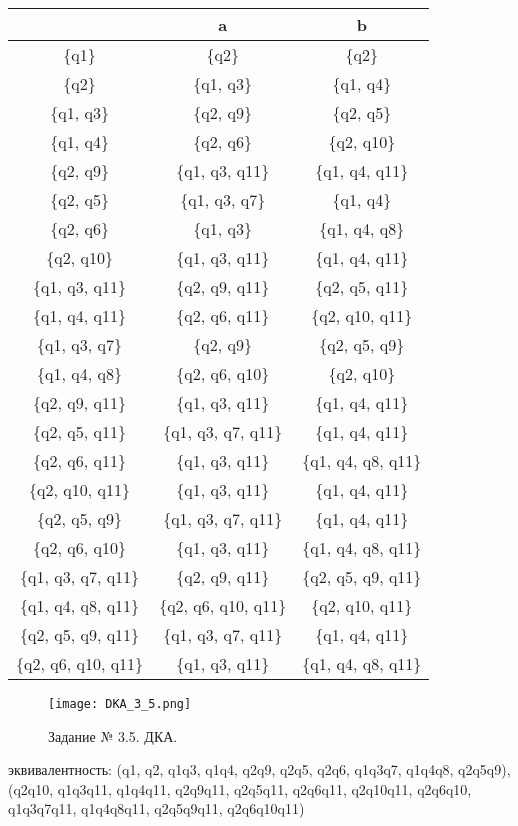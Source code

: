 \documentclass[a4paper, 12pt]{article}
\begin{document}
\begin{enumerate}
\begin{center}
\begin{tabular}{ |c|c|c| } 
\hline
\, & a & b \\
\hline
 \{q1\} & \{q2\} & \{q2\} \\
\hline
 \{q2\} & \{q1, q3\} & \{q1, q4\} \\
\hline
 \{q1, q3\} & \{q2, q9\} & \{q2, q5\} \\
\hline
 \{q1, q4\} & \{q2, q6\} & \{q2, q10\} \\
\hline
 \{q2, q9\} & \{q1, q3, q11\} & \{q1, q4, q11\} \\
\hline
 \{q2, q5\} & \{q1, q3, q7\} & \{q1, q4\} \\
\hline
 \{q2, q6\} & \{q1, q3\} & \{q1, q4, q8\} \\
\hline
\{q2, q10\} & \{q1, q3, q11\} & \{q1, q4, q11\} \\
\hline
\{q1, q3, q11\} & \{q2, q9, q11\} & \{q2, q5, q11\} \\
\hline
\{q1, q4, q11\} & \{q2, q6, q11\} & \{q2, q10, q11\} \\
\hline
\{q1, q3, q7\} & \{q2, q9\} & \{q2, q5, q9\} \\
\hline
\{q1, q4, q8\} & \{q2, q6, q10\} & \{q2, q10\} \\
\hline
\{q2, q9, q11\} & \{q1, q3, q11\} & \{q1, q4, q11\} \\
\hline
\{q2, q5, q11\} & \{q1, q3, q7, q11\} & \{q1, q4, q11\} \\
\hline
\{q2, q6, q11\} & \{q1, q3, q11\} & \{q1, q4, q8, q11\} \\
\hline
\{q2, q10, q11\} & \{q1, q3, q11\} & \{q1, q4, q11\} \\
\hline
\{q2, q5, q9\} & \{q1, q3, q7, q11\} & \{q1, q4, q11\} \\
\hline
\{q2, q6, q10\} & \{q1, q3, q11\} & \{q1, q4, q8, q11\} \\
\hline
\{q1, q3, q7, q11\} & \{q2, q9, q11\} & \{q2, q5, q9, q11\} \\
\hline
\{q1, q4, q8, q11\} & \{q2, q6, q10, q11\} & \{q2, q10, q11\} \\
\hline
\{q2, q5, q9, q11\} & \{q1, q3, q7, q11\} & \{q1, q4, q11\} \\
\hline
\{q2, q6, q10, q11\} & \{q1, q3, q11\} & \{q1, q4, q8, q11\} \\
\hline
\end{tabular}
\end{center}

\begin{figure}[h!]
\centering
\texttt{[image: DKA\_3\_5.png]}
\caption{Задание № 3.5. ДКА.}
\end{figure}

 эквивалентность: (q1, q2, q1q3, q1q4, q2q9, q2q5, q2q6, q1q3q7, q1q4q8, q2q5q9), (q2q10, q1q3q11, q1q4q11, q2q9q11, q2q5q11, q2q6q11, q2q10q11, q2q6q10, q1q3q7q11, q1q4q8q11, q2q5q9q11, q2q6q10q11)

\end{enumerate}
\end{document}
